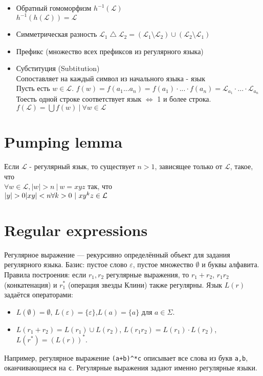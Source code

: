 \documentclass{article}
\begin{document}
\begin{itemize}
		\item Обратный гомоморфизм \(h^{-1}(\mathcal{L})\)\\
		\(h^{-1}(h(\mathcal{L})) = \mathcal{L}\)
		\item Симметрическая разность \(\mathcal{L}_1 \bigtriangleup \mathcal{L}_2 = (\mathcal{L}_1 \setminus \mathcal{L}_2) \cup (\mathcal{L}_2 \setminus \mathcal{L}_1)\)
		\item Префикс (множество всех префиксов из регулярного языка)
		\item Субституция (Subtitution)\\
		Сопоставляет на каждый символ из начального языка - язык\\
		Пусть есть $w \in \mathcal{L}$. $f(w) = f(a_1...a_n) = f(a_1) \cdot ... \cdot f(a_n) = \mathcal{L}_{a_1} \cdot ... \cdot \mathcal{L}_{a_n}$\\
		Тоесть одной строке соответствует язык $\iff$ 1 и более строка.\\
		\(f(\mathcal{L}) = \bigcup f(w) \ | \ \forall w \in \mathcal{L}\)
		
	\end{itemize}
	
	\section{Pumping lemma}
	Если $\mathcal{L}$ - регулярный язык, то существует $n > 1$, зависящее только от $\mathcal{L}$, такое, что \\ \(\forall w \in \mathcal{L}, |w| > n \ | \ w = xyz\) так, что \\
	\(
	|y| > 0\\
	|xy| < n\\
	\forall k > 0 \ | \ xy^kz \in \mathcal{L}
	\)
	

\section{Regular expressions}
Регулярное выражение --- рекурсивно определённый объект для задания регулярного языка. Базис: пустое слово $\varepsilon$, пустое множество $\emptyset$ и буквы алфавита. Правила построения: если $r_1,r_2$ регулярные выражения, то $r_1 + r_2$, $r_1 r_2$ (конкатенация) и $r_1^*$ (операция звезды Клини) также регулярны. Язык $L(r)$ задаётся операторами:
\begin{itemize}
	\item $L(\emptyset)=\emptyset$, \;$L(\varepsilon)=\{\varepsilon\}$,\;$L(a)=\{a\}$ для $a\in\Sigma$.
	\item $L(r_1 + r_2) = L(r_1)\cup L(r_2)$, \;$L(r_1 r_2) = L(r_1)\cdot L(r_2)$, \;$L(r^*) = (L(r))^*$.
\end{itemize}
Например, регулярное выражение \texttt{(a+b)\^{}*c} описывает все слова из букв \texttt{a,b}, оканчивающиеся на \texttt{c}. Регулярные выражения задают именно регулярные языки.
\end{document}
